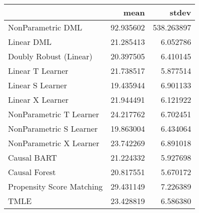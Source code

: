 \begin{tabular}{lrr}
\toprule
{} &       mean &       stdev \\
\midrule
NonParametric DML         &  92.935602 &  538.263897 \\
Linear DML                &  21.285413 &    6.052786 \\
Doubly Robust (Linear)    &  20.397505 &    6.410145 \\
Linear T Learner          &  21.738517 &    5.877514 \\
Linear S Learner          &  19.435944 &    6.901133 \\
Linear X Learner          &  21.944491 &    6.121922 \\
NonParametric T Learner   &  24.217762 &    6.702451 \\
NonParametric S Learner   &  19.863004 &    6.434064 \\
NonParametric X Learner   &  23.742269 &    6.891018 \\
Causal BART               &  21.224332 &    5.927698 \\
Causal Forest             &  20.817551 &    5.670172 \\
Propensity Score Matching &  29.431149 &    7.226389 \\
TMLE                      &  23.428819 &    6.586380 \\
\bottomrule
\end{tabular}
